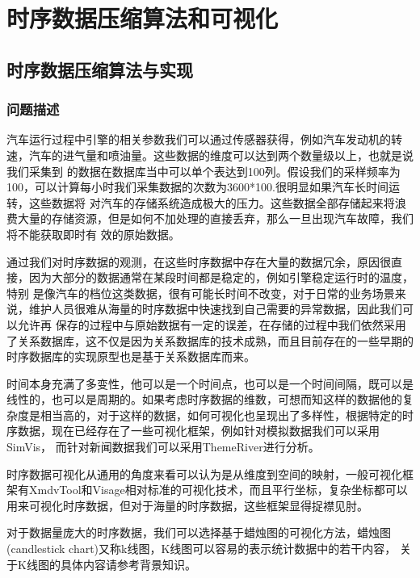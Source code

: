 
\chapter{时序数据压缩算法和可视化}
\label{Chapter 3}

\section{时序数据压缩算法与实现}
\label{section 3.1}
\subsection{问题描述}
\label{section 3.11}
汽车运行过程中引擎的相关参数我们可以通过传感器获得，例如汽车发动机的转速，汽车的进气量和喷油量。这些数据的维度可以达到两个数量级以上，也就是说我们采集到
的数据在数据库当中可以单个表达到100列。假设我们的采样频率为100，可以计算每小时我们采集数据的次数为3600*100.很明显如果汽车长时间运转，这些数据将
对汽车的存储系统造成极大的压力。这些数据全部存储起来将浪费大量的存储资源，但是如何不加处理的直接丢弃，那么一旦出现汽车故障，我们将不能获取即时有
效的原始数据。

通过我们对时序数据的观测，在这些时序数据中存在大量的数据冗余，原因很直接，因为大部分的数据通常在某段时间都是稳定的，例如引擎稳定运行时的温度，特别
是像汽车的档位这类数据，很有可能长时间不改变，对于日常的业务场景来说，维护人员很难从海量的时序数据中快速找到自己需要的异常数据，因此我们可以允许再
保存的过程中与原始数据有一定的误差，在存储的过程中我们依然采用了关系数据库，这不仅是因为关系数据库的技术成熟，而且目前存在的一些早期的时序数据库的实现原型也是基于关系数据库而来。


时间本身充满了多变性，他可以是一个时间点，也可以是一个时间间隔，既可以是线性的，也可以是周期的。如果考虑时序数据的维数，可想而知这样的数据他的复
杂度是相当高的，对于这样的数据，如何可视化也呈现出了多样性，根据特定的时序数据，现在已经存在了一些可视化框架，例如针对模拟数据我们可以采用SimVis，
而针对新闻数据我们可以采用ThemeRiver进行分析。

时序数据可视化从通用的角度来看可以认为是从维度到空间的映射，一般可视化框架有XmdvTool和Visage相对标准的可视化技术，而且平行坐标，复杂坐标都可以用来可视化时序数据，但对于海量的时序数据，这些框架显得捉襟见肘。

对于数据量庞大的时序数据，我们可以选择基于蜡烛图的可视化方法，蜡烛图(candlestick chart)又称k线图，K线图可以容易的表示统计数据中的若干内容，
关于K线图的具体内容请参考背景知识。


